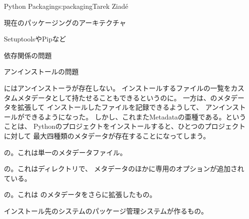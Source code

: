 \begin{aosachapter}{Python Packaging}{s:packaging}{Tarek Ziad\'{e}}
\begin{aosasect1}{現在のパッケージングのアーキテクチャ}
\begin{aosasect2}{SetuptoolsやPipなど}
\begin{aosasect3}{依存関係の問題}
\begin{aosaitemize}
\end{aosaitemize}

\end{aosasect3}

\begin{aosasect3}{アンインストールの問題}

にはアンインストーラが存在しない。
インストールするファイルの一覧をカスタムメタデータとして持たせることもできるというのに。
一方は、のメタデータを拡張して
インストールしたファイルを記録できるようして、
アンインストールができるようになった。
しかし、これまたMetadataの亜種である。ということは、
Pythonのプロジェクトをインストールすると、ひとつのプロジェクトに対して
最大四種類のメタデータが存在することになってしまう。

\begin{aosaitemize}

  \item {}の。これは単一のメタデータファイル。

  \item {}の。これはディレクトリで、
  メタデータのほかに専用のオプションが追加されている。

  \item {}の。これは
  のメタデータをさらに拡張したもの。

  \item インストール先のシステムのパッケージ管理システムが作るもの。


\end{aosaitemize}
\end{aosasect3}
\end{aosasect2}
\end{aosasect1}
\end{aosachapter}
